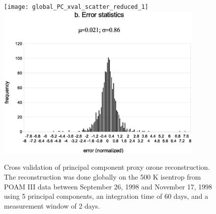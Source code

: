 \begin{figure}
  \centering
  \texttt{[image: global\_PC\_xval\_scatter\_reduced\_1]}
  \includegraphics[width=0.9\textwidth]{global_PC_xval_error}
  \caption{Cross validation of principal component proxy ozone reconstruction. The reconstruction was done globally on the 500 K isentrop from POAM III data between September 26, 1998 and November 17, 1998 using 5 principal components,  an integration time of 60 days, and a measurement window of 2 days.}
  \label{PC_cross_validation}
\end{figure}

